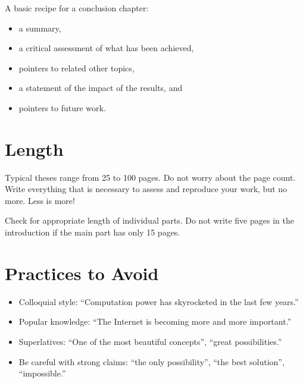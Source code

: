 A basic recipe for a conclusion chapter:
\begin{itemize}
\item a summary,
\item a critical assessment of what has been achieved,
\item pointers to related other topics,
\item a statement of the impact of the results, and
\item pointers to future work.
\end{itemize}

\section{Length}

Typical theses range from 25 to 100 pages. Do not worry about the page count. Write everything that is necessary to assess and reproduce your work, but no more. Less is more!

Check for appropriate length of individual parts. Do not write five pages in the introduction if the main part has only 15 pages.


\section{Practices to Avoid}

\begin{itemize}
\item Colloquial style: “Computation power has skyrocketed in the last few years.”
\item Popular knowledge: “The Internet is becoming more and more important.”
\item Superlatives: “One of the most beautiful concepts”, “great possibilities.”
\item Be careful with strong claims: “the only possibility”, “the best solution”, “impossible.”
\end{itemize} 